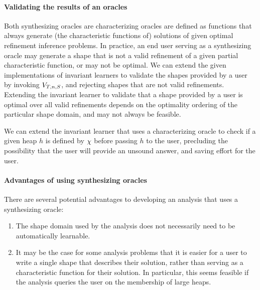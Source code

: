 \paragraph{Validating the results of an oracles} Both synthesizing
oracles are characterizing oracles are defined as functions that
always generate (the characteristic functions of) solutions of given
optimal refinement inference problems.
%
In practice, an end user serving as a synthesizing oracle may generate
a shape that is not a valid refinement of a given partial
characteristic function, or may not be optimal.
%
We can extend the given implementations of invariant learners to
validate the shapes provided by a user by invoking $V_{T,
  n, S}$, and rejecting shapes that are not valid refinements.
%
Extending the invariant learner to validate that a shape provided by
a user is optimal over all valid refinements depends on the optimality
ordering of the particular shape domain, and may not always be
feasible.

We can extend the invariant learner that uses a characterizing oracle
to check if a given heap $h$ is defined by $\chi$ before
passing $h$ to the user, precluding the possibility that the user will
provide an unsound answer, and saving effort for the user.

\paragraph{Advantages of using synthesizing oracles}
%
There are several potential advantages to developing an analysis that
uses a synthesizing oracle:
%
\begin{enumerate}
\item
  The shape domain used by the analysis does not necessarily need
  to be automatically learnable.
\item
  It may be the case for some analysis problems that it is easier for
  a user to write a single shape that describes their solution, rather
  than serving as a characteristic function for their solution.
  In particular, this seems feasible if the analysis queries the user
  on the membership of large heaps.
\end{enumerate}

